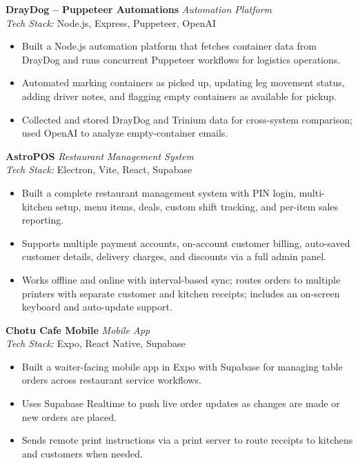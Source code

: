\documentclass[11pt,a4paper]{article}
\newcommand{\resumeItemList}{\begin{itemize}[leftmargin=*, nosep, topsep=2pt]}
\newcommand{\resumeItemListEnd}{\end{itemize}}
\begin{document}
\vspace{4pt}

\textbf{DrayDog -- Puppeteer Automations} \hfill \textit{Automation Platform} \\
\textit{Tech Stack:} Node.js, Express, Puppeteer, OpenAI
\resumeItemList
  \item Built a Node.js automation platform that fetches container data from DrayDog and runs concurrent Puppeteer workflows for logistics operations.
  \item Automated marking containers as picked up, updating leg movement status, adding driver notes, and flagging empty containers as available for pickup.
  \item Collected and stored DrayDog and Trinium data for cross-system comparison; used OpenAI to analyze empty-container emails.
\resumeItemListEnd

\vspace{4pt}

\textbf{AstroPOS} \hfill \textit{Restaurant Management System} \\
\textit{Tech Stack:} Electron, Vite, React, Supabase
\resumeItemList
  \item Built a complete restaurant management system with PIN login, multi-kitchen setup, menu items, deals, custom shift tracking, and per-item sales reporting.
  \item Supports multiple payment accounts, on-account customer billing, auto-saved customer details, delivery charges, and discounts via a full admin panel.
  \item Works offline and online with interval-based sync; routes orders to multiple printers with separate customer and kitchen receipts; includes an on-screen keyboard and auto-update support.
\resumeItemListEnd

\vspace{4pt}

\textbf{Chotu Cafe Mobile} \hfill \textit{Mobile App} \\
\textit{Tech Stack:} Expo, React Native, Supabase
\resumeItemList
  \item Built a waiter-facing mobile app in Expo with Supabase for managing table orders across restaurant service workflows.
  \item Uses Supabase Realtime to push live order updates as changes are made or new orders are placed.
  \item Sends remote print instructions via a print server to route receipts to kitchens and customers when needed.
\resumeItemListEnd
\end{document}
